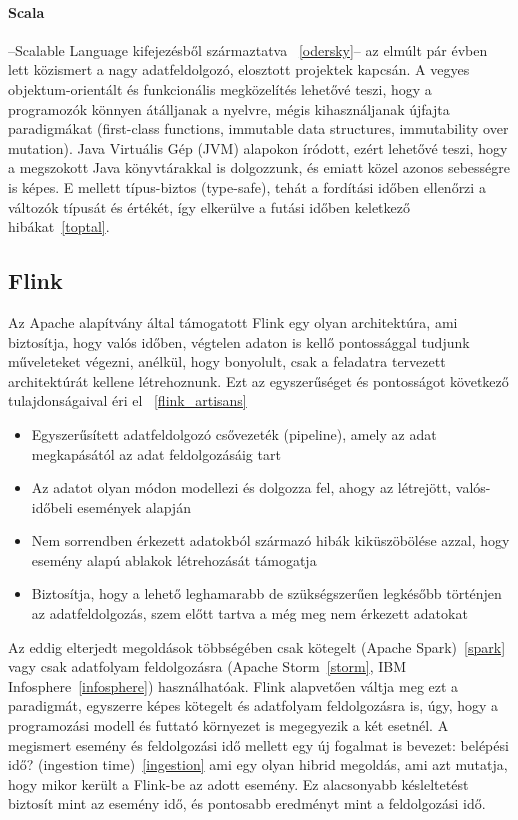 \documentclass[a4paper,12pt]{article}
\begin{document}
\paragraph{Scala}\hspace*{-0.3cm}--Scalable Language kifejezésből származtatva ~\ref{odersky}-- az elmúlt pár évben lett közismert a nagy adatfeldolgozó, elosztott projektek kapcsán. A vegyes objektum-orientált és funkcionális megközelítés lehetővé teszi, hogy a programozók könnyen átálljanak a nyelvre, mégis kihasználjanak újfajta paradigmákat (first-class functions, immutable data structures, immutability over mutation). Java Virtuális Gép (JVM) alapokon íródott, ezért lehetővé teszi, hogy a megszokott Java könyvtárakkal is dolgozzunk, és emiatt közel azonos sebességre is képes.  E mellett típus-biztos (type-safe), tehát a fordítási időben ellenőrzi a változók típusát és értékét, így elkerülve a futási időben keletkező hibákat~\ref{toptal}. 

\subsection{Flink}
Az Apache alapítvány által támogatott Flink egy olyan architektúra, ami biztosítja, hogy valós időben, végtelen adaton is kellő pontossággal tudjunk műveleteket végezni, anélkül, hogy bonyolult, csak a feladatra tervezett architektúrát kellene létrehoznunk. Ezt az egyszerűséget és pontosságot következő tulajdonságaival éri el ~\ref{flink_artisans}
\begin{itemize}
\item Egyszerűsített adatfeldolgozó csővezeték (pipeline), amely az adat megkapásától az adat feldolgozásáig tart
\item Az adatot olyan módon modellezi és dolgozza fel, ahogy az létrejött, valós-időbeli események alapján
\item Nem sorrendben érkezett adatokból származó hibák kiküszöbölése azzal, hogy esemény alapú ablakok létrehozását támogatja
\item Biztosítja, hogy a lehető leghamarabb de szükségszerűen legkésőbb történjen az adatfeldolgozás, szem előtt tartva a még meg nem érkezett adatokat
\end{itemize}

Az eddig elterjedt megoldások többségében csak kötegelt (Apache Spark)~\ref{spark} vagy csak adatfolyam feldolgozásra (Apache Storm~\ref{storm}, IBM Infosphere~\ref{infosphere}) használhatóak. Flink alapvetően váltja meg ezt a paradigmát, egyszerre képes kötegelt és adatfolyam feldolgozásra is, úgy, hogy a programozási modell és futtató környezet is megegyezik a két esetnél. A megismert esemény és feldolgozási idő mellett egy új fogalmat is bevezet: belépési idő? (ingestion time)~\ref{ingestion} ami egy olyan hibrid megoldás, ami azt mutatja, hogy mikor került a Flink-be az adott esemény.
Ez alacsonyabb késleltetést biztosít mint az esemény idő, és pontosabb eredményt mint a feldolgozási idő. \linebreak
\end{document}
